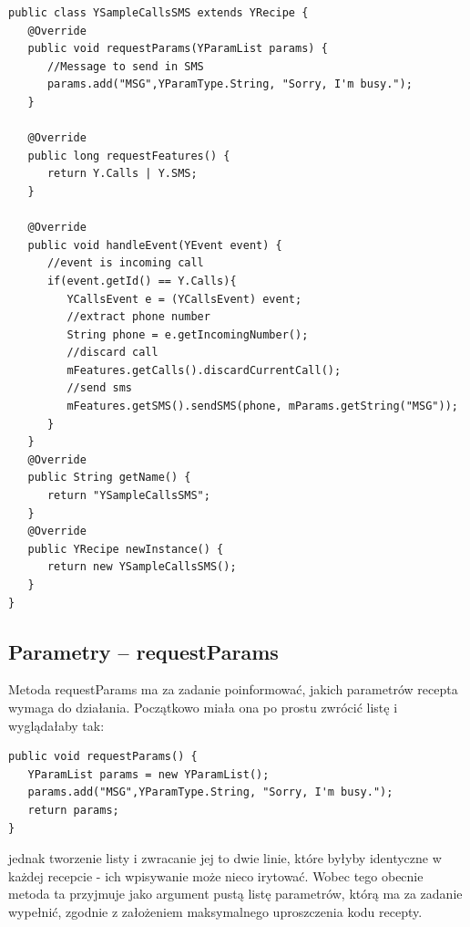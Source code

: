 \documentclass[11pt,a4paper,polish,thesis]{dcsbook}
\begin{document}
\begin{verbatim}
public class YSampleCallsSMS extends YRecipe {
   @Override
   public void requestParams(YParamList params) {
      //Message to send in SMS
      params.add("MSG",YParamType.String, "Sorry, I'm busy.");
   }

   @Override
   public long requestFeatures() {
      return Y.Calls | Y.SMS;
   }

   @Override
   public void handleEvent(YEvent event) {
      //event is incoming call
      if(event.getId() == Y.Calls){
         YCallsEvent e = (YCallsEvent) event;
         //extract phone number
         String phone = e.getIncomingNumber();
         //discard call
         mFeatures.getCalls().discardCurrentCall();
         //send sms
         mFeatures.getSMS().sendSMS(phone, mParams.getString("MSG"));
      }
   }
   @Override
   public String getName() {
      return "YSampleCallsSMS";
   }
   @Override
   public YRecipe newInstance() {
      return new YSampleCallsSMS();
   }
}
\end{verbatim}
\subsection{Parametry -- requestParams}
Metoda requestParams ma za zadanie poinformować, jakich parametrów recepta wymaga do działania. Początkowo miała ona po prostu zwrócić listę i wyglądałaby tak:
\begin{verbatim}
public void requestParams() {
   YParamList params = new YParamList();
   params.add("MSG",YParamType.String, "Sorry, I'm busy.");
   return params;
}
\end{verbatim}
jednak tworzenie listy i zwracanie jej to dwie linie, które byłyby identyczne w każdej recepcie - ich wpisywanie może nieco irytować. Wobec tego obecnie metoda ta przyjmuje jako argument pustą listę parametrów, którą ma za zadanie wypełnić, zgodnie z założeniem maksymalnego uproszczenia kodu recepty.
\end{document}
